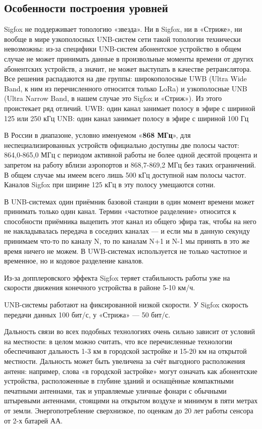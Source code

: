 \subsection{Особенности построения уровней}
Sigfox не поддерживает топологию «звезда». Ни в Sigfox, ни в «Стриже», ни вообще в мире узкополосных UNB-систем сети такой топологии технически невозможны: из-за специфики UNB-систем абонентское устройство в общем случае не может принимать данные в произвольные моменты времени от других абонентских устройств, а значит, не может выступать в качестве ретранслятора.
Все решения распадаются на две группы: широкополосные UWB (Ultra Wide Band, к ним из перечисленного относится только LoRa) и узкополосные UNB (Ultra Narrow Band, в нашем случае это Sigfox и «Стриж»). Из этого проистекает ряд отличий.
UWB: один канал занимает полосу в эфире с шириной 125 или 250 кГц
UNB: один канал занимает полосу в эфире с шириной 100 Гц

В России в диапазоне, условно именуемом «\textbf{868 МГц}», для
неспециализированных устройств официально доступны две полосы частот:
864,0-865,0 МГц с периодом активной работы не более одной десятой процента и
запретом на работу вблизи аэропортов и 868,7-869,2 МГц без таких ограничений. В общем случае мы имеем всего лишь 500 кГц доступной нам полосы частот. Каналов Sigfox при ширине 125 кГц в эту полосу умещаются сотни.

В UNB-системах один приёмник базовой станции в один момент времени может принимать только один канал.  Термин «частотное разделение» относится к способности приёмника выцепить этот канал из общего эфира так, чтобы на него не накладывалась передача в соседних каналах — и если мы в данную секунду принимаем что-то по каналу N, то по каналам N+1 и N-1 мы принять в это же время ничего не можем. В UWB-системах используется не только частотное и временное, но и кодовое разделение каналов.  

Из-за допплеровского эффекта Sigfox теряет стабильность работы уже на скорости движения конечного устройства в районе 5-10 км/ч. 

UNB-системы работают на фиксированной низкой скорости. У Sigfox скорость передачи данных 100 бит/с, у «Стрижа» — 50 бит/с.

Дальность связи во всех подобных технологиях очень сильно зависит от условий на местности: в целом можно считать, что все перечисленные технологии обеспечивают дальность 1-3 км в городской застройке и 15-20 км на открытой местности. Дальность может быть увеличена за счёт выгодного расположения антенн: например, слова «в городской застройке» могут означать как абонентские устройства, расположенные в глубине зданий и оснащённые компактными печатными антеннами, так и управляемые уличные фонари с обычными штыревыми антеннами, стоящими на открытом воздухе и минимум в пяти метрах от земли.
Энергопотребление сверхнизкое, по оценкам до 20 лет работы сенсора от 2-х батарей АА. 

\newpage